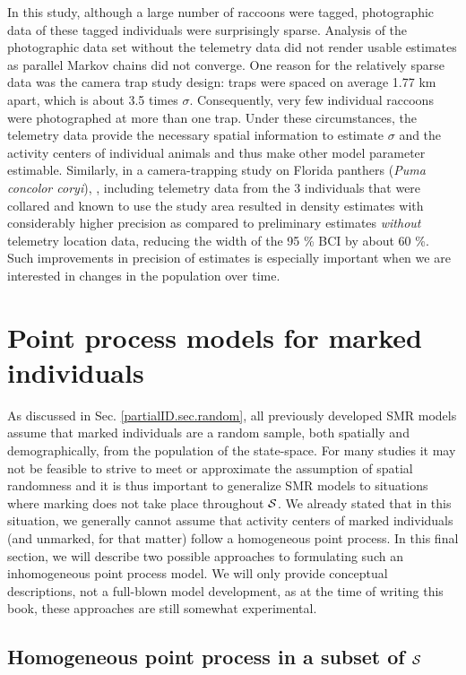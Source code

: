 In this study, although a large number of raccoons were tagged,
photographic data of these tagged individuals were surprisingly
sparse. Analysis of the photographic data set without the telemetry
data did not render usable estimates as parallel Markov chains did not
converge. One reason for the relatively sparse data was the camera
trap study design: traps were spaced on average 1.77 km apart, which
is about 3.5 times $\sigma$. Consequently, very few individual
raccoons were photographed at more than one trap. Under these
circumstances, the telemetry data provide the necessary spatial
information to estimate $\sigma$ and the activity centers of
individual animals and thus make other model parameter
estimable. Similarly, in a camera-trapping study on Florida panthers
(\emph{Puma concolor coryi}), \citet{sollmann_etal:inprepjapplecol},
including telemetry data from the 3 individuals that were collared and
known to use the study area resulted in density estimates with
considerably higher precision as compared to preliminary estimates
\emph{without} telemetry location data, reducing the width of the 95
\% BCI by about 60 \%. Such improvements in precision of estimates is
especially important when we are interested in changes in the
population over time.


\section{Point process models for marked individuals}

As discussed in Sec. \ref{partialID.sec.random}, all previously
developed SMR models assume that marked individuals are a random
sample, both spatially and demographically, from the population of the
state-space. For many studies it may not be feasible to strive to meet
or approximate the assumption of spatial randomness and it is thus
important to generalize SMR models to situations where marking does
not take place throughout ${\cal S}$. We already stated that in this
situation, we generally cannot assume that activity centers of marked
individuals (and unmarked, for that matter) follow a homogeneous
point process. In this final section, we will describe two possible
approaches to formulating such an inhomogeneous point process model. We will
only provide conceptual descriptions, not a full-blown model
development, as at the time of writing this book, these approaches are
still somewhat experimental.


\subsection{Homogeneous point process in a subset of ${\cal S}$}

